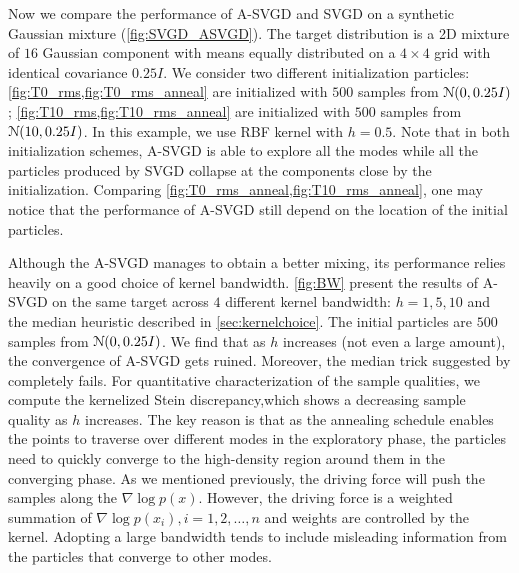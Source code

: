 Now we compare the performance of A-SVGD and SVGD on a synthetic Gaussian mixture (\cref{fig:SVGD_ASVGD}). The target distribution is a 2D mixture of $16$ Gaussian component with means equally distributed on a $4 \times 4$ grid with identical covariance $0.25I$.  We consider two different initialization particles: \cref{fig:T0_rms,fig:T0_rms_anneal} are initialized with $500$ \iid samples from $\mathcal{N}(0, 0.25I)$; \cref{fig:T10_rms,fig:T10_rms_anneal} are initialized with $500$ \iid samples from $\mathcal{N}(10, 0.25I)$. In this example, we use RBF kernel with $h = 0.5$. Note that in both initialization schemes, A-SVGD is able to explore all the modes 
while all the particles produced by SVGD collapse at the components close by the initialization. Comparing \cref{fig:T0_rms_anneal,fig:T10_rms_anneal}, one may notice that the performance of A-SVGD still depend on the location of the initial particles. 

Although the A-SVGD manages to obtain a better mixing, its performance relies heavily on a good choice of kernel bandwidth. \cref{fig:BW} present the results of A-SVGD on the same target across $4$ different kernel bandwidth: $h = 1, 5, 10$ and the median heuristic described in \cref{sec:kernelchoice}. The initial particles are $500$ \iid samples from $\mathcal{N}(0, 0.25I)$. We find that as $h$ increases (not even a large amount), the convergence of A-SVGD gets ruined. Moreover, the median trick suggested by \citet{liu2016stein} completely fails. For quantitative characterization of the sample qualities, we compute the kernelized Stein discrepancy,which shows a decreasing sample quality as $h$ increases. The key reason is that as the annealing schedule enables the points to traverse over different modes in the exploratory phase, the particles need to quickly converge to  the high-density region around them in the converging phase. As we mentioned previously, the driving force will push the samples along the $\nabla \log p(x)$. However, the driving force is a weighted summation of $\nabla \log p(x_i), i=1, 2, \dots, n$ and weights are controlled by the kernel. Adopting a large bandwidth tends to include misleading information from the particles that converge to other modes. 



